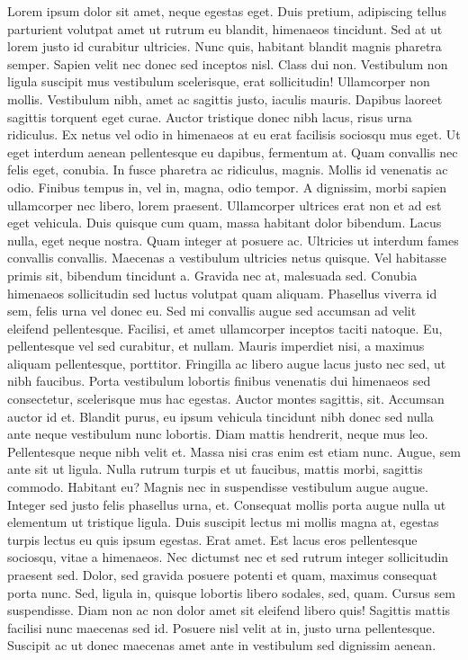 \documentclass[
  12pt,
]{article}
\begin{document}
Lorem ipsum dolor sit amet, neque egestas eget. Duis pretium, adipiscing tellus parturient volutpat amet ut rutrum eu blandit, himenaeos tincidunt. Sed at ut lorem justo id curabitur ultricies. Nunc quis, habitant blandit magnis pharetra semper. Sapien velit nec donec sed inceptos nisl. Class dui non. Vestibulum non ligula suscipit mus vestibulum scelerisque, erat sollicitudin! Ullamcorper non mollis. Vestibulum nibh, amet ac sagittis justo, iaculis mauris. Dapibus laoreet sagittis torquent eget curae. Auctor tristique donec nibh lacus, risus urna ridiculus. Ex netus vel odio in himenaeos at eu erat facilisis sociosqu mus eget. Ut eget interdum aenean pellentesque eu dapibus, fermentum at. Quam convallis nec felis eget, conubia. In fusce pharetra ac ridiculus, magnis. Mollis id venenatis ac odio. Finibus tempus in, vel in, magna, odio tempor. A dignissim, morbi sapien ullamcorper nec libero, lorem praesent. Ullamcorper ultrices erat non et ad est eget vehicula. Duis quisque cum quam, massa habitant dolor bibendum. Lacus nulla, eget neque nostra. Quam integer at posuere ac. Ultricies ut interdum fames convallis convallis. Maecenas a vestibulum ultricies netus quisque. Vel habitasse primis sit, bibendum tincidunt a. Gravida nec at, malesuada sed. Conubia himenaeos sollicitudin sed luctus volutpat quam aliquam. Phasellus viverra id sem, felis urna vel donec eu. Sed mi convallis augue sed accumsan ad velit eleifend pellentesque. Facilisi, et amet ullamcorper inceptos taciti natoque. Eu, pellentesque vel sed curabitur, et nullam. Mauris imperdiet nisi, a maximus aliquam pellentesque, porttitor. Fringilla ac libero augue lacus justo nec sed, ut nibh faucibus. Porta vestibulum lobortis finibus venenatis dui himenaeos sed consectetur, scelerisque mus hac egestas. Auctor montes sagittis, sit. Accumsan auctor id et. Blandit purus, eu ipsum vehicula tincidunt nibh donec sed nulla ante neque vestibulum nunc lobortis. Diam mattis hendrerit, neque mus leo. Pellentesque neque nibh velit et. Massa nisi cras enim est etiam nunc. Augue, sem ante sit ut ligula. Nulla rutrum turpis et ut faucibus, mattis morbi, sagittis commodo. Habitant eu? Magnis nec in suspendisse vestibulum augue augue. Integer sed justo felis phasellus urna, et. Consequat mollis porta augue nulla ut elementum ut tristique ligula. Duis suscipit lectus mi mollis magna at, egestas turpis lectus eu quis ipsum egestas. Erat amet. Est lacus eros pellentesque sociosqu, vitae a himenaeos. Nec dictumst nec et sed rutrum integer sollicitudin praesent sed. Dolor, sed gravida posuere potenti et quam, maximus consequat porta nunc. Sed, ligula in, quisque lobortis libero sodales, sed, quam. Cursus sem suspendisse. Diam non ac non dolor amet sit eleifend libero quis! Sagittis mattis facilisi nunc maecenas sed id. Posuere nisl velit at in, justo urna pellentesque. Suscipit ac ut donec maecenas amet ante in vestibulum sed dignissim aenean.
\end{document}
